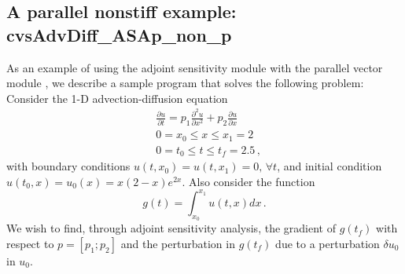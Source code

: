 

\subsection{A parallel nonstiff example: cvsAdvDiff\_ASAp\_non\_p}
\label{ss:cvsAdvDiff_ASAp_non_p}

As an example of using the {\cvodes} adjoint sensitivity module with the
parallel vector module {\nvecp}, we describe a sample program that solves
the following problem:  Consider the 1-D advection-diffusion equation
\begin{equation}\label{e:cvsAdvDiff_ASAp_non_p:orig_pde}
  \begin{split}
    & \frac{\partial u}{\partial t} = p_1 \frac{\partial^2 u}{\partial x^2} 
    + p_2 \frac{\partial u}{\partial x} \\
    & 0 = x_0 \le x \le x_1 = 2 \\
    & 0 = t_0 \le t \le t_f = 2.5 \, ,
  \end{split}
\end{equation}
with boundary conditions $u(t,x_0) = u(t,x_1) = 0 ,\, \forall t$,
and initial condition $u(t_0 , x) = u_0(x) = x(2-x)e^{2x}$. Also
consider the function
\begin{equation*}
  g(t) = \int_{x_0}^{x_1} u(t,x) dx \, .
\end{equation*}
We wish to find, through adjoint sensitivity analysis, the gradient of
$g(t_f)$ with respect to $p = [p_1 ; p_2]$ and the perturbation in $g(t_f)$
due to a perturbation $\delta u_0$ in $u_0$.

